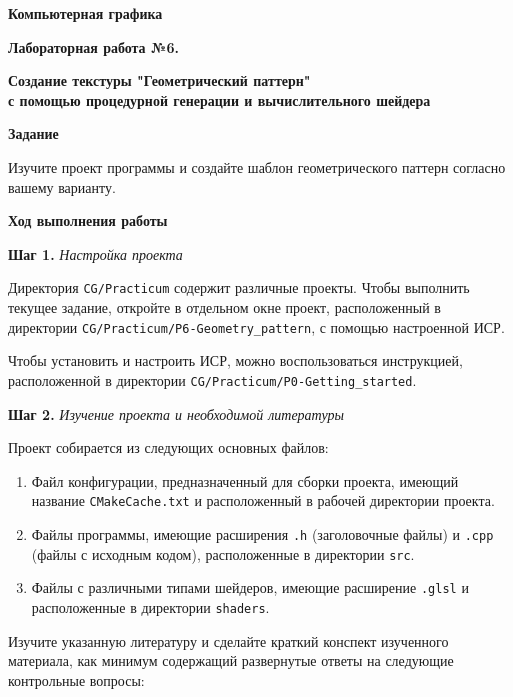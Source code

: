\documentclass[a4paper,12pt]{article}
\begin{document}
\fontsize{14pt}{16pt}\selectfont
\begin{center}
    \textbf{{\Large Компьютерная графика}}
    
    \textbf{{\large Лабораторная работа №6. }}
    
    \textbf{{\large Создание текстуры "Геометрический паттерн" \\ с помощью процедурной генерации и вычислительного шейдера}}
    \end{center}
    
    \textbf{Задание}
    
    Изучите проект программы и создайте шаблон геометрического паттерн согласно вашему варианту.
    
    \textbf{Ход выполнения работы}
    
    \textbf{Шаг 1.} \textit{Настройка проекта}
    
    Директория \texttt{CG/Practicum} содержит различные проекты. Чтобы выполнить текущее задание, откройте в отдельном окне проект, расположенный в директории \texttt{CG/Practicum/P6-Geometry\_pattern}, с помощью настроенной ИСР.
    
    Чтобы установить и настроить ИСР, можно воспользоваться инструкцией, расположенной в директории \texttt{CG/Practicum/P0-Getting\_started}.
    
    \textbf{Шаг 2.} \textit{Изучение проекта и необходимой литературы}
    
    Проект собирается из следующих основных файлов:
    
    \begin{enumerate}
        \item Файл конфигурации, предназначенный для сборки проекта, имеющий название \texttt{CMakeCache.txt} и расположенный в рабочей директории проекта.
        \item Файлы программы, имеющие расширения \texttt{.h} (заголовочные файлы) и \texttt{.cpp} (файлы с исходным кодом), расположенные в директории \texttt{src}.
        \item Файлы с различными типами шейдеров, имеющие расширение \texttt{.glsl} и расположенные в директории \texttt{shaders}.
    \end{enumerate}
    
    Изучите указанную литературу и сделайте краткий конспект изученного материала, как минимум содержащий развернутые ответы на следующие контрольные вопросы:
    
\end{document}
